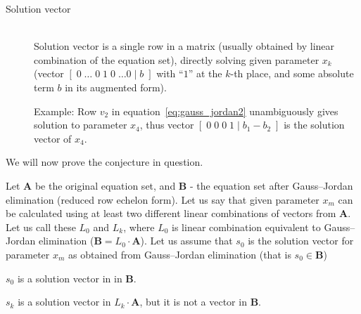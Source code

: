 \begin{description}
\begin{description}
        \item[Solution vector] \hfill \\
            Solution vector is a single row in a matrix (usually obtained by linear combination of the equation set), directly solving given parameter $x_k$ (vector $[\;0 \;\ldots\;0\;1\;0\; \ldots 0 \;|\; b\;]$ with ``$1$'' at the $k$-th place, and some absolute term $b$ in its augmented form).

            Example:
            Row $v_2$ in equation~\ref{eq:gauss_jordan2} unambiguously gives solution to parameter $x_4$, thus vector $[\;0\;0\;0\;1\;|\;b_1 - b_2\;]$ is the solution vector of $x_4$.
    \end{description}

    We will now prove the conjecture in question. 

    Let $\boldsymbol{A}$ be the original equation set, and $\boldsymbol{B}$ - the equation set after Gauss--Jordan elimination (reduced row echelon form).
    Let us say that given parameter $x_m$ can be calculated using at least two different linear combinations of vectors from $\boldsymbol{A}$.
    Let us call these $L_0$ and $L_k$, where $L_0$ is linear combination equivalent to Gauss--Jordan elimination ($\boldsymbol{B} = L_0 \cdot \boldsymbol{A}$).
    Let us assume that $s_0$ is the solution vector for parameter $x_m$ as obtained from Gauss--Jordan elimination (that is $s_0 \in \boldsymbol{B}$)

    $s_0$ is a solution vector in in $\boldsymbol{B}$.

    $s_k$ is a solution vector in $L_k \cdot \boldsymbol{A}$, but it is not a vector in $\boldsymbol{B}$.


\end{description}
